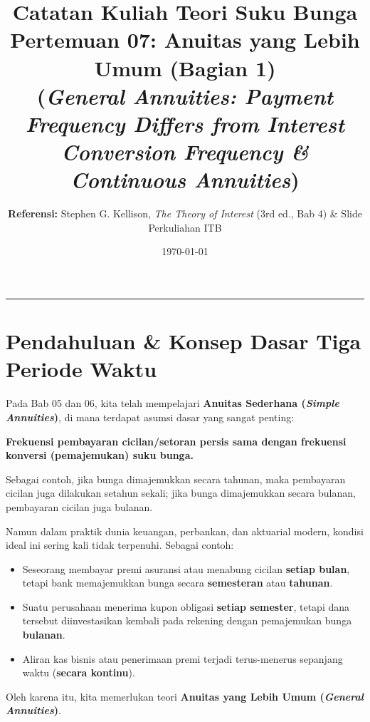 \documentclass[11pt,a4paper]{article}
\title{\textbf{\LARGE Catatan Kuliah Teori Suku Bunga}\\[0.3em]
\Large Pertemuan 07: Anuitas yang Lebih Umum (Bagian 1)\\
\large (\textit{General Annuities: Payment Frequency Differs from Interest Conversion Frequency \& Continuous Annuities})}
\author{\textbf{Referensi:} Stephen G. Kellison, \textit{The Theory of Interest} (3rd ed., Bab 4) \& Slide Perkuliahan ITB}
\date{\today}
\begin{document}
\maketitle
\tableofcontents
\vspace{1em}
\noindent\rule{\textwidth}{0.4pt}
\vspace{1.5em}

\section{Pendahuluan \& Konsep Dasar Tiga Periode Waktu}

Pada Bab 05 dan 06, kita telah mempelajari \textbf{Anuitas Sederhana (\textit{Simple Annuities})}, di mana terdapat asumsi dasar yang sangat penting:
\begin{center}
    \textbf{Frekuensi pembayaran cicilan/setoran persis sama dengan frekuensi konversi (pemajemukan) suku bunga.}
\end{center}
Sebagai contoh, jika bunga dimajemukkan secara tahunan, maka pembayaran cicilan juga dilakukan setahun sekali; jika bunga dimajemukkan secara bulanan, pembayaran cicilan juga bulanan.

Namun dalam praktik dunia keuangan, perbankan, dan aktuarial modern, kondisi ideal ini sering kali tidak terpenuhi. Sebagai contoh:
\begin{itemize}[leftmargin=1.5em]
    \item Seseorang membayar premi asuransi atau menabung cicilan \textbf{setiap bulan}, tetapi bank memajemukkan bunga secara \textbf{semesteran} atau \textbf{tahunan}.
    \item Suatu perusahaan menerima kupon obligasi \textbf{setiap semester}, tetapi dana tersebut diinvestasikan kembali pada rekening dengan pemajemukan bunga \textbf{bulanan}.
    \item Aliran kas bisnis atau penerimaan premi terjadi terus-menerus sepanjang waktu (\textbf{secara kontinu}).
\end{itemize}

Oleh karena itu, kita memerlukan teori \textbf{Anuitas yang Lebih Umum (\textit{General Annuities})}.
\end{document}

